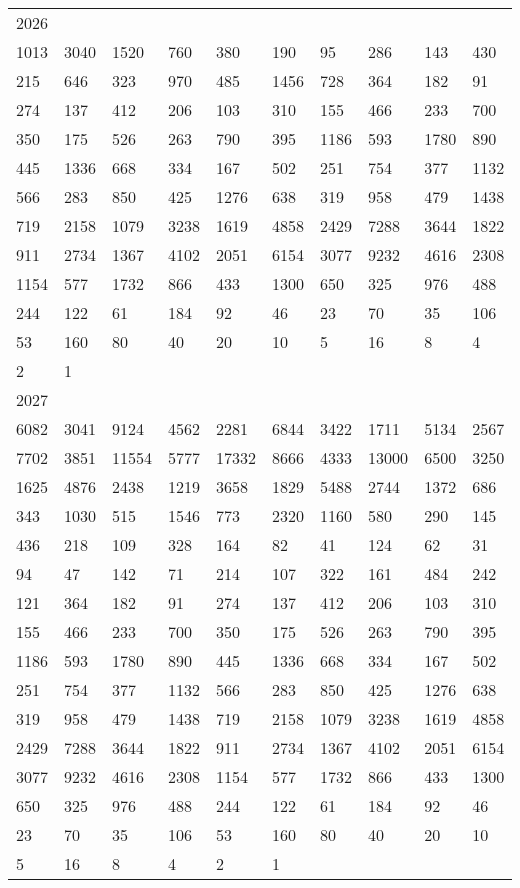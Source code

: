 \begin{longtable}{*{10}{l}}
2026&&&&&&&&&\\
1013& 3040& 1520& 760& 380& 190& 95& 286& 143& 430\\
215& 646& 323& 970& 485& 1456& 728& 364& 182& 91\\
274& 137& 412& 206& 103& 310& 155& 466& 233& 700\\
350& 175& 526& 263& 790& 395& 1186& 593& 1780& 890\\
445& 1336& 668& 334& 167& 502& 251& 754& 377& 1132\\
566& 283& 850& 425& 1276& 638& 319& 958& 479& 1438\\
719& 2158& 1079& 3238& 1619& 4858& 2429& 7288& 3644& 1822\\
911& 2734& 1367& 4102& 2051& 6154& 3077& 9232& 4616& 2308\\
1154& 577& 1732& 866& 433& 1300& 650& 325& 976& 488\\
244& 122& 61& 184& 92& 46& 23& 70& 35& 106\\
53& 160& 80& 40& 20& 10& 5& 16& 8& 4\\
2& 1& \\

2027&&&&&&&&&\\
6082& 3041& 9124& 4562& 2281& 6844& 3422& 1711& 5134& 2567\\
7702& 3851& 11554& 5777& 17332& 8666& 4333& 13000& 6500& 3250\\
1625& 4876& 2438& 1219& 3658& 1829& 5488& 2744& 1372& 686\\
343& 1030& 515& 1546& 773& 2320& 1160& 580& 290& 145\\
436& 218& 109& 328& 164& 82& 41& 124& 62& 31\\
94& 47& 142& 71& 214& 107& 322& 161& 484& 242\\
121& 364& 182& 91& 274& 137& 412& 206& 103& 310\\
155& 466& 233& 700& 350& 175& 526& 263& 790& 395\\
1186& 593& 1780& 890& 445& 1336& 668& 334& 167& 502\\
251& 754& 377& 1132& 566& 283& 850& 425& 1276& 638\\
319& 958& 479& 1438& 719& 2158& 1079& 3238& 1619& 4858\\
2429& 7288& 3644& 1822& 911& 2734& 1367& 4102& 2051& 6154\\
3077& 9232& 4616& 2308& 1154& 577& 1732& 866& 433& 1300\\
650& 325& 976& 488& 244& 122& 61& 184& 92& 46\\
23& 70& 35& 106& 53& 160& 80& 40& 20& 10\\
5& 16& 8& 4& 2& 1& \\


\end{longtable}
